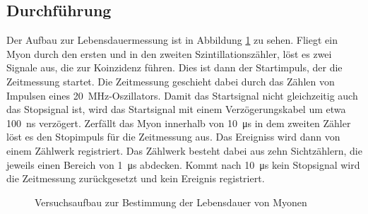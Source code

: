 \subsection{Durchführung}
Der Aufbau zur Lebensdauermessung ist in Abbildung \ref{fig:lebensdauer_aufbau} zu sehen. Fliegt ein Myon durch den ersten und in den zweiten Szintillationszähler, löst es zwei Signale aus, die zur Koinzidenz führen. Dies ist dann der Startimpuls, der die Zeitmessung startet. Die Zeitmessung geschieht dabei durch das Zählen von Impulsen eines \SI{20}{\mega\hertz}-Oszillators. Damit das Startsignal nicht gleichzeitig auch das Stopsignal ist, wird das Startsignal mit einem Verzögerungskabel um etwa \SI{100}{\nano\second} verzögert. Zerfällt das Myon innerhalb von \SI{10}{\micro\second} in dem zweiten Zähler löst es den Stopimpuls für die Zeitmessung aus. Das Ereigniss wird dann von einem Zählwerk registriert. Das Zählwerk besteht dabei aus zehn Sichtzählern, die jeweils einen Bereich von \SI{1}{\micro\second} abdecken. Kommt nach \SI{10}{\micro\second} kein Stopsignal wird die Zeitmessung zurückgesetzt und kein Ereignis registriert. 

\begin{figure}[h]
  \centering
  \caption{Versuchsaufbau zur Bestimmung der Lebensdauer von Myonen}
  \label{fig:lebensdauer_aufbau}
\end{figure}

